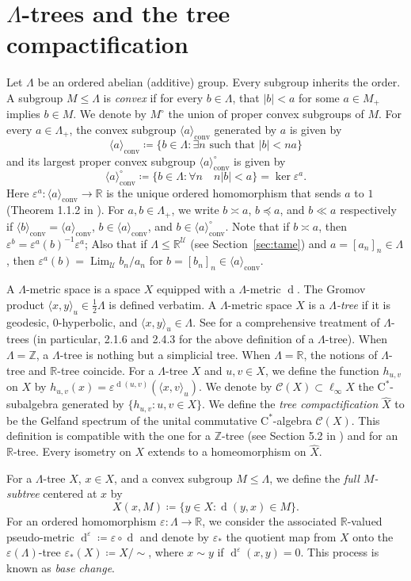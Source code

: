 \documentclass[12pt,nosumlimits,nonamelimits]{amsart}
\theoremstyle{remark}
\theoremstyle{definition}
\newcommand{\IR}{\mathbb{R}}
\newcommand{\IZ}{\mathbb{Z}}
\newcommand{\rC}{\mathrm{C}}
\newcommand{\cC}{\mathcal{C}}
\newcommand{\cU}{\mathcal{U}}
\newcommand{\ve}{\varepsilon}
\newcommand{\La}{\Lambda}
\DeclareMathOperator{\Lim}{Lim}
\DeclareMathOperator{\dist}{d}
\DeclareMathOperator{\conv}{conv}
\newcommand{\ip}[1]{\mathopen{\langle}#1\mathclose{\rangle}}
\newcommand{\cst}{$\rC^*$-alge\-bra}
\begin{document}
\section{$\La$-trees and the tree compactification}
%
%
Let $\La$ be an ordered abelian (additive) group. 
Every subgroup inherits the order. 
A subgroup $M \le \La$ is \emph{convex} if 
for every $b\in\La$, that $|b|<a$ for some $a\in M_+$ implies $b\in M$. 
We denote by $M^\circ$ the union of proper convex subgroups of $M$.
For every $a\in\La_+$, 
the convex subgroup $\ip{a}_{\conv}$ generated by $a$ is given by 
\[
\ip{a}_{\conv} \coloneq \{ b\in\La : \exists n \mbox{ such that } |b| < na\}
\]
and its largest proper convex subgroup $\ip{a}_{\conv}^\circ$ is given by 
\[
\ip{a}_{\conv}^\circ \coloneq \{ b\in\La : \forall n\quad n|b| < a\} = \ker \ve^a.
\]
Here $\ve^a\colon \ip{a}_{\conv} \to\IR$ is the unique ordered homomorphism 
that sends $a$ to $1$ (Theorem 1.1.2 in \cite{chiswell}). 
For $a,b\in\La_+$, 
we write $b\asymp a$, $b\preceq a$, and $b \ll a$ 
respectively if 
$\ip{b}_{\conv}=\ip{a}_{\conv}$, $b\in \ip{a}_{\conv}$, 
and $b \in \ip{a}_{\conv}^\circ$. 
Note that if $b\asymp a$, 
then $\ve^b = \ve^a(b)^{-1}\ve^a$; 
Also that if $\La \le \IR^\cU$ 
(see Section~\ref{sec:tame}) and $a = [a_n]_n\in\La$, then 
$\ve^a( b ) = \Lim_\cU b_n/a_n$ for $b = [b_n]_n \in \ip{a}_{\conv}$. 
%
%

A $\La$-metric space is a space $X$ equipped with 
a $\La$-metric $\dist$. 
The Gromov product $\ip{x,y}_u\in\frac{1}{2}\La$ is defined verbatim. 
A $\La$-metric space $X$ is a \emph{$\La$-tree} 
if it is geodesic, $0$-hyper\-bolic, and $\ip{x,y}_u\in\La$. 
See \cite{chiswell} for a comprehensive treatment 
of $\La$-trees (in particular, 2.1.6 and 2.4.3 for 
the above definition of a $\La$-tree). 
When $\La=\IZ$, a $\La$-tree is nothing but a simplicial tree. 
When $\La=\IR$, the notions of $\La$-tree and $\IR$-tree coincide. 
For a $\La$-tree $X$ and $u,v\in X$, we define 
the function $h_{u,v}$ on $X$ by $h_{u,v}(x)=\ve^{\dist(u,v)}(\ip{x,v}_u)$. 
We denote by $\cC(X)\subset\ell_\infty X$ 
the $\rC^*$-subalgebra generated by $\{ h_{u,v} : u,v\in X\}$. 
We define the \emph{tree compactification} $\hat{X}$ to be 
the Gelfand spectrum of the unital commutative \cst{} $\cC(X)$. 
This definition is compatible with the one for 
a $\IZ$-tree (see Section 5.2 in \cite{bo}) 
and for an $\IR$-tree. 
Every isometry on $X$ extends to a homeomorphism on $\hat{X}$.

For a $\La$-tree $X$, $x\in X$, and a convex subgroup $M\le\La$, 
we define the \emph{full $M$-subtree} centered at $x$ by 
\[
X(x,M) \coloneq \{ y\in X : \dist(y,x) \in M\}.
\]
For an ordered homomorphism $\ve\colon \La\to\IR$, 
we consider the associated $\IR$-valued pseudo-metric 
$\dist^\ve \coloneq\ve\circ\dist$ and denote by 
$\ve_*$ the quotient map from $X$ onto 
the $\ve(\La)$-tree $\ve_*(X) \coloneq X/{\sim}$, 
where $x\sim y$ if $\dist^\ve(x,y)=0$. 
This process is known as \emph{base change}. 
\end{document}
